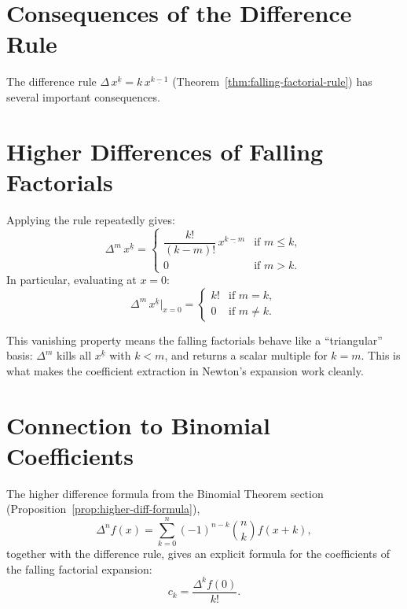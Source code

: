 
\section*{Consequences of the Difference Rule}

The difference rule \(\Delta\,x^{\underline{k}} = k\,x^{\underline{k-1}}\)
(Theorem~\ref{thm:falling-factorial-rule}) has several important consequences.

\section*{Higher Differences of Falling Factorials}

Applying the rule repeatedly gives:
\[
\Delta^m\, x^{\underline{k}}
=
\begin{cases}
\dfrac{k!}{(k-m)!}\, x^{\underline{k-m}} & \text{if } m \le k, \\[6pt]
0 & \text{if } m > k.
\end{cases}
\]
In particular, evaluating at \(x = 0\):
\[
\Delta^m\, x^{\underline{k}}\big|_{x=0}
=
\begin{cases}
k! & \text{if } m = k, \\
0 & \text{if } m \ne k.
\end{cases}
\]

\begin{remark*}
This vanishing property means the falling factorials behave like a
``triangular'' basis: \(\Delta^m\) kills all \(x^{\underline{k}}\) with
\(k < m\), and returns a scalar multiple for \(k = m\). This is what
makes the coefficient extraction in Newton's expansion work cleanly.
\end{remark*}

\section*{Connection to Binomial Coefficients}

The higher difference formula from the Binomial Theorem section
(Proposition~\ref{prop:higher-diff-formula}),
\[
\Delta^n f(x) = \sum_{k=0}^{n}(-1)^{n-k}\binom{n}{k}f(x+k),
\]
together with the difference rule, gives an explicit formula for the
coefficients of the falling factorial expansion:
\[
c_k = \frac{\Delta^k f(0)}{k!}.
\]

